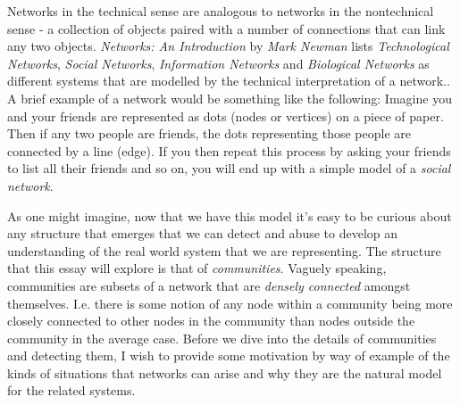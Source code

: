 Networks in the technical sense are analogous to networks in the nontechnical sense - a collection of objects paired with a number of connections that can link any two objects. \emph{Networks: An Introduction} by \emph{Mark Newman} lists \emph{Technological Networks}, \emph{Social Networks}, \emph{Information Networks} and \emph{Biological Networks} as different systems that are modelled by the technical interpretation of a network.\cite[Contents]{newman10}. A brief example of a network would be something like the following: Imagine you and your friends are represented as dots (nodes or vertices) on a piece of paper. Then if any two people are friends, the dots representing those people are connected by a line (edge). If you then repeat this process by asking your friends to list all their friends and so on, you will end up with a simple model of a \emph{social network}.

As one might imagine, now that we have this model it's easy to be curious about any structure that emerges that we can detect and abuse to develop an understanding of the real world system that we are representing. The structure that this essay will explore is that of \emph{communities}. Vaguely speaking, communities are subsets of a network that are \emph{densely connected} amongst themselves. I.e. there is some notion of any node within a community being more closely connected to other nodes in the community than nodes outside the community in the average case. Before we dive into the details of communities and detecting them, I wish to provide some motivation by way of example of the kinds of situations that networks can arise and why they are the natural model for the related systems.

